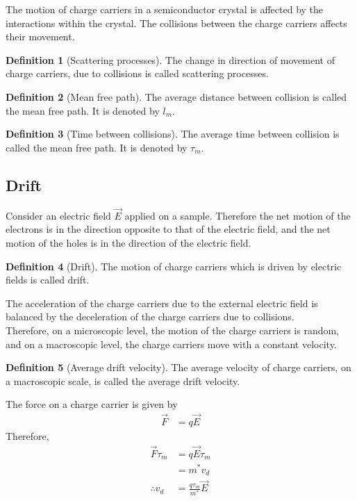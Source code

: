 \documentclass[titlepage, fleqn, a4paper, 12pt, twoside]{article}
\theoremstyle{definition}
\newtheorem{definition}{Definition}
\theoremstyle{theorem}
\let\Oldsubsection\subsection
\renewcommand{\subsection}{\FloatBarrier\Oldsubsection}
\begin{document}
The motion of charge carriers in a semiconductor crystal is affected by the interactions within the crystal.
The collisions between the charge carriers affects their movement.

\begin{definition}[Scattering processes]
	The change in direction of movement of charge carriers, due to collisions is called scattering processes.
\end{definition}

\begin{definition}[Mean free path]
	The average distance between collision is called the mean free path.
	It is denoted by $l_m$.
\end{definition}

\begin{definition}[Time between collisions]
	The average time between collision is called the mean free path.
	It is denoted by $\tau_m$.
\end{definition}

\subsection{Drift}

Consider an electric field $\overrightarrow{E}$ applied on a sample.
Therefore the net motion of the electrons is in the direction opposite to that of the electric field, and the net motion of the holes is in the direction of the electric field.

\begin{definition}[Drift]
	The motion of charge carriers which is driven by electric fields is called drift.
\end{definition}

The acceleration of the charge carriers due to the external electric field is balanced by the deceleration of the charge carriers due to collisions.\\
Therefore, on a microscopic level, the motion of the charge carriers is random, and on a macroscopic level, the charge carriers move with a constant velocity.
\begin{definition}[Average drift velocity]
	The average velocity of charge carriers, on a macroscopic scale, is called the average drift velocity.
\end{definition}

The force on a charge carrier is given by
\begin{align*}
	\overrightarrow{F} &= q \overrightarrow{E}
\end{align*}
Therefore,
\begin{align*}
	\overrightarrow{F} \tau_m &= q \overrightarrow{E} \tau_m\\
	&= m^* v_d\\
	\therefore v_d &= \frac{q \tau_m}{m^*} \overrightarrow{E}
\end{align*}
\end{document}

